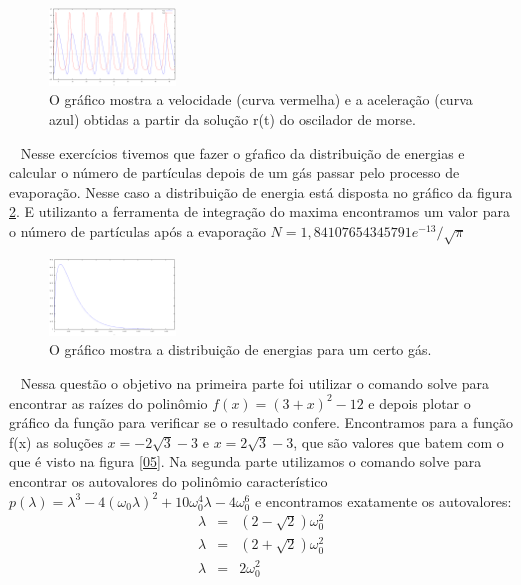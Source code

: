 \documentclass[a4wide]{report}
\begin{document}
\
\begin{figure}[h]
\centering
\includegraphics[width=0.30\textwidth]{03d.pdf}
\caption{O gráfico mostra a velocidade (curva vermelha) e a aceleração (curva azul) obtidas a partir da solução r(t) do oscilador de morse.}
\label{03d}
\end{figure}
\
 Nesse exercícios tivemos que fazer o gŕafico da distribuição de energias e calcular o número de partículas depois de um gás passar pelo processo de evaporação. Nesse caso a distribuição de energia está disposta no gráfico da figura \ref{04}. E utilizanto a ferramenta de integração do maxima encontramos um valor para o número de partículas após a evaporação $N=1,84107654345791e^{-13}/\sqrt{\pi}$
\
\begin{figure}[h]
\centering
\includegraphics[width=0.30\textwidth]{04.pdf}
\caption{O gráfico mostra a distribuição de energias para um certo gás.}
\label{04}
\end{figure}
\
\noindent{\bf Questão 5-)} Nessa questão o objetivo na primeira parte foi utilizar o comando solve para encontrar as raízes do polinômio $f(x)=(3+x)^{2}-12$ e depois plotar o gráfico da função para verificar se o resultado confere. Encontramos para a função f(x) as soluções $x=-2\sqrt{3}-3$ e $x=2\sqrt{3}-3$, que são valores que batem com o que é visto na figura \ref{05}. Na segunda parte utilizamos o comando solve para encontrar os autovalores do polinômio característico $p(\lambda)= \lambda^{3}-4(\omega_{0} \lambda)^{2}+10\omega_{0}^{4}\lambda-4\omega_{0}^{6}$ e encontramos exatamente os autovalores:
\begin{eqnarray}
\lambda &=& (2- \sqrt{2}) \omega_{0}^{2}\\
\lambda &=& (2+ \sqrt{2}) \omega_{0}^{2}\\
\lambda &=& 2 \omega_{0}^{2}
\end{eqnarray}
\end{document}
